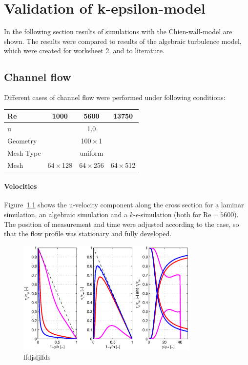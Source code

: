 \chapter{Validation of k-epsilon-model} %
\label{cha:validation_of_k_epsilon_model}

In the following section results of simulations with the Chien-wall-model are shown. The results were compared to results of the algebraic turbulence model, which were created for worksheet 2, and to literature.

\section{Channel flow} %
\label{sec:channel_flow}

Different cases of channel flow were performed under following conditions:

\begin{center}
\begin{tabular}{lccc}
\hline 
Re        & 1000 & 5600 & 13750\\\hline         
u         & \multicolumn{3}{c}{1.0}\\
Geometry  & \multicolumn{3}{c}{100\,$\times$\,1} \\
Mesh Type & \multicolumn{3}{c}{uniform} \\
Mesh      & 64\,$\times$\,128 & 64\,$\times$\,256 & 64\,$\times$\,512 \\\hline 
\end{tabular}
\end{center}

\subsubsection*{Velocities}

Figure~\ref{fig:channel-u-profile} shows the u-velocity component along the cross section for a laminar simulation, an algebraic simulation and a $k$-$\epsilon$-simulation (both for Re$=5600$). The position of measurement and time were adjusted according to the case, so that the flow profile was stationary and fully developed.

\begin{figure}[!htb]
\centering
\includegraphics[width=0.8\textwidth]{FIGURES/tau.eps}
\caption{lfdjsljlfds}
\label{fig:channel-u-profile}
\end{figure} 


